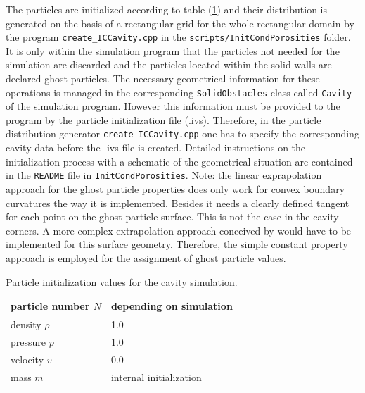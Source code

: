 \documentclass[11pt,a4paper,twoside]{report}
\begin{document}
The particles are initialized according to table (\ref{tab:InitPartValues_Cavity}) and their distribution is generated on the basis of a rectangular grid for the whole rectangular domain by the program {\tt create\_ICCavity.cpp} in the {\tt scripts/InitCondPorosities} folder. It is only within the simulation program that the particles not needed for the simulation are discarded and the particles located within the solid walls are declared ghost particles. The necessary geometrical information for these operations is managed in the corresponding {\tt SolidObstacles} class called {\tt Cavity} of the simulation program.
However this information must be provided to the program by the particle initialization file (.ivs). Therefore, in the particle distribution generator {\tt create\_ICCavity.cpp} one has to specify the corresponding cavity data before the -ivs file is created. Detailed instructions on the initialization process with a schematic of the geometrical situation are contained in the {\tt README} file in {\tt InitCondPorosities}.
Note: the linear exprapolation approach for the ghost particle properties does only work for convex boundary curvatures the way it is implemented. Besides it needs a clearly defined tangent for each point on the ghost particle surface. This is not the case in the cavity corners.
A more complex extrapolation approach conceived by \cite{Yildiz2009} would have to be implemented for this surface geometry. Therefore, the simple constant property approach is employed for the assignment of ghost particle values.


\begin{table}[h] %
\label{tab:InitPartValues_Cavity}
\centering

\begin{tabular}[c]{|l|p{5cm}|} %
\hline
\hline
particle number $N$ &  depending on simulation\\
\hline
density $\rho$ &  1.0\\
\hline
pressure $p$ &  1.0 \\
\hline
velocity $v$ & 0.0\\
\hline
mass $m$ & internal initialization\\
\hline
\hline
\end{tabular}
\caption[]{Particle initialization values for the cavity simulation.}

\end{table}
\end{document}
